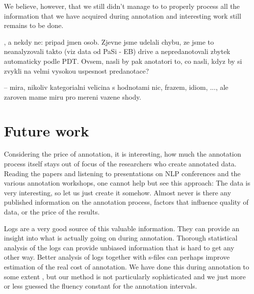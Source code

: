 We believe, however, that we still didn't manage to to properly process all the information that we have acquired during annotation and interesting work still remains to be done.
%

, a nekdy ne: pripad jmen osob. Zjevne jsme udelali chybu, ze jsme to neanalyzovali takto (viz data od PaSi - EB) drive a nepredanotovali zbytek automaticky podle PDT. Ovsem, nasli by pak anotatori to, co nasli, kdyz by si zvykli na velmi vysokou uspesnost predanotace?

 -- mira, nikoliv kategorialni velicina s hodnotami nic, frazem, idiom, ..., ale zaroven mame miru pro mereni vazene shody. 

\section{Future work}
\label{sec:conc:logs}
Considering the price of annotation, it is interesting, how much the annotation process itself stays out of focus of the researchers who create annotated data. Reading the papers and listening to presentations on NLP conferences and the various annotation workshops, one cannot help but see this approach: The data is very interesting, so let us just create it somehow. Almost never is there any published information on the annotation process, factors that influence quality of data, or the price of the results. 

Logs are a  very good source of this valuable information. They can provide an insight into what is actually going on during annotation. Thorough statistical analysis of the logs can provide unbiased information that is hard to get any other way. Better analysis of logs together with s-files can perhaps improve estimation of the real cost of annotation. We have done this during annotation to some extent , but our method is not particularly sophisticated and we just more or less guessed the fluency constant for the annotation intervals.
 

